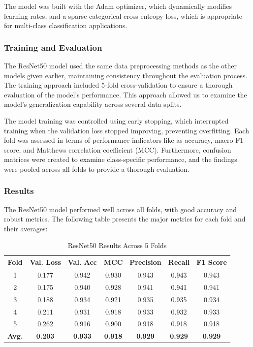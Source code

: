 \documentclass[conference]{IEEEtran}
\begin{document}
The model was built with the Adam optimizer, which dynamically modifies learning rates, and a sparse categorical cross-entropy loss, which is appropriate for multi-class classification applications.

\subsubsection{Training and Evaluation}

The ResNet50 model used the same data preprocessing methods as the other models given earlier, maintaining consistency throughout the evaluation process. The training approach included 5-fold cross-validation to ensure a thorough evaluation of the model's performance. This approach allowed us to examine the model's generalization capability across several data splits.

The model training was controlled using early stopping, which interrupted training when the validation loss stopped improving, preventing overfitting. Each fold was assessed in terms of performance indicators like as accuracy, macro F1-score, and Matthews correlation coefficient (\ac{MCC}). Furthermore, confusion matrices were created to examine class-specific performance, and the findings were pooled across all folds to provide a thorough evaluation.

\subsubsection{Results}

The ResNet50 model performed well across all folds, with good accuracy and robust metrics. The following table presents the major metrics for each fold and their averages:

\begin{table}[h!]
    \centering
    
    \begin{tabular}{|c|c|c|c|c|c|c|}
    \hline
    \textbf{Fold} & \textbf{Val. Loss} & \textbf{Val. Acc} & \textbf{MCC} & \textbf{Precision} & \textbf{Recall} & \textbf{F1 Score} \\ \hline
    1 & 0.177 & 0.942 & 0.930 & 0.943 & 0.943 & 0.943 \\ \hline
    2 & 0.175 & 0.940 & 0.928 & 0.941 & 0.941 & 0.941 \\ \hline
    3 & 0.188 & 0.934 & 0.921 & 0.935 & 0.935 & 0.934 \\ \hline
    4 & 0.211 & 0.931 & 0.918 & 0.933 & 0.932 & 0.933 \\ \hline
    5 & 0.262 & 0.916 & 0.900 & 0.918 & 0.918 & 0.918 \\ \hline
    \textbf{Avg.} & \textbf{0.203} & \textbf{0.933} & \textbf{0.918} & \textbf{0.929} & \textbf{0.929} & \textbf{0.929} \\ \hline
    \end{tabular}
    \caption{ResNet50 Results Across 5 Folds}
    \label{tab:resnet50_results}
\end{table}
\end{document}
